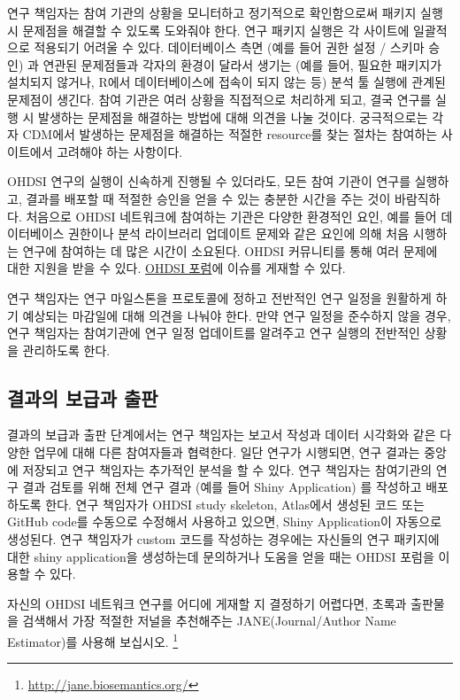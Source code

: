 \documentclass[11pt]{book}
\let\rmarkdownfootnote\footnote%
\def\footnote{\protect\rmarkdownfootnote}
\theoremstyle{definition}
\theoremstyle{definition}
\theoremstyle{definition}
\theoremstyle{remark}
\let\BeginKnitrBlock\begin \let\EndKnitrBlock\end
\begin{document}
연구 책임자는 참여 기관의 상황을 모니터하고 정기적으로 확인함으로써
패키지 실행 시 문제점을 해결할 수 있도록 도와줘야 한다. 연구 패키지
실행은 각 사이트에 일괄적으로 적용되기 어려울 수 있다. 데이터베이스 측면
(예를 들어 권한 설정 / 스키마 승인) 과 연관된 문제점들과 각자의 환경이
달라서 생기는 (예를 들어, 필요한 패키지가 설치되지 않거나, R에서
데이터베이스에 접속이 되지 않는 등) 분석 툴 실행에 관계된 문제점이
생긴다. 참여 기관은 여러 상황을 직접적으로 처리하게 되고, 결국 연구를
실행 시 발생하는 문제점을 해결하는 방법에 대해 의견을 나눌 것이다.
궁극적으로는 각자 CDM에서 발생하는 문제점을 해결하는 적절한 resource를
찾는 절차는 참여하는 사이트에서 고려해야 하는 사항이다.

OHDSI 연구의 실행이 신속하게 진행될 수 있더라도, 모든 참여 기관이 연구를
실행하고, 결과를 배포할 때 적절한 승인을 얻을 수 있는 충분한 시간을 주는
것이 바람직하다. 처음으로 OHDSI 네트워크에 참여하는 기관은 다양한
환경적인 요인, 예를 들어 데이터베이스 권한이나 분석 라이브러리 업데이트
문제와 같은 요인에 의해 처음 시행하는 연구에 참여하는 데 많은 시간이
소요된다. OHDSI 커뮤니티를 통해 여러 문제에 대한 지원을 받을 수 있다.
\href{http://forums.ohdsi.org}{OHDSI 포럼}에 이슈를 게재할 수 있다.

연구 책임자는 연구 마일스톤을 프로토콜에 정하고 전반적인 연구 일정을
원활하게 하기 예상되는 마감일에 대해 의견을 나눠야 한다. 만약 연구
일정을 준수하지 않을 경우, 연구 책임자는 참여기관에 연구 일정 업데이트를
알려주고 연구 실행의 전반적인 상황을 관리하도록 한다.

\subsection{결과의 보급과 출판}\label{--}

결과의 보급과 출판 단계에서는 연구 책임자는 보고서 작성과 데이터
시각화와 같은 다양한 업무에 대해 다른 참여자들과 협력한다. 일단 연구가
시행되면, 연구 결과는 중앙에 저장되고 연구 책임자는 추가적인 분석을 할
수 있다. 연구 책임자는 참여기관의 연구 결과 검토를 위해 전체 연구 결과
(예를 들어 Shiny Application) 를 작성하고 배포하도록 한다. 연구 책임자가
OHDSI study skeleton, Atlas에서 생성된 코드 또는 GitHub code를 수동으로
수정해서 사용하고 있으면, Shiny Application이 자동으로 생성된다. 연구
책임자가 custom 코드를 작성하는 경우에는 자신들의 연구 패키지에 대한
shiny application을 생성하는데 문의하거나 도움을 얻을 때는 OHDSI 포럼을
이용할 수 있다.

\BeginKnitrBlock{rmdimportant}
자신의 OHDSI 네트워크 연구를 어디에 게재할 지 결정하기 어렵다면, 초록과
출판물을 검색해서 가장 적절한 저널을 추천해주는 JANE(Journal/Author Name
Estimator)를 사용해 보십시오. \footnote{\url{http://jane.biosemantics.org/}}
\EndKnitrBlock{rmdimportant}
\end{document}
